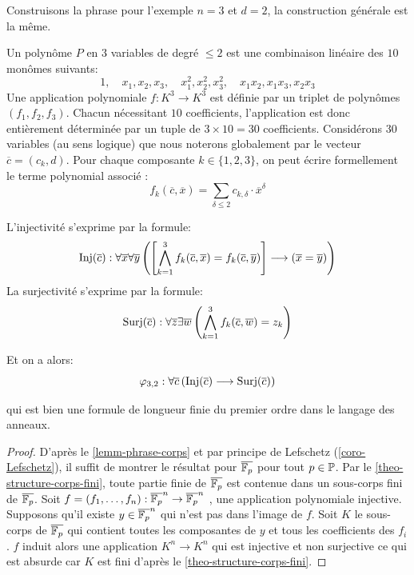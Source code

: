 \begin{exem}
Construisons la phrase pour l'exemple $n=3$ et $d=2$, la construction générale
est la même.

Un polynôme $P$ en $3$ variables de degré $\le 2$ est une combinaison linéaire des $10$ monômes suivants:
    \[ 1, \quad x_1, x_2, x_3, \quad x_1^2, x_2^2, x_3^2, \quad x_1x_2, x_1x_3, x_2x_3 \]
    Une application polynomiale $f: K^3 \to K^3$ est définie par un triplet de polynômes $(f_1, f_2, f_3)$.
    Chacun nécessitant $10$ coefficients, l'application est donc entièrement déterminée
    par un tuple de $3 \times 10 = 30$ coefficients.
    Considérons 30 variables (au sens logique) que nous noterons globalement par
    le vecteur $\overline{c} = (c_k,d)$. 
    Pour chaque composante $k \in \{1,2,3\}$, on peut écrire formellement le terme polynomial associé :
    \[ f_k(\overline{c}, \overline{x}) = \sum_{\delta \le 2} c_{k,\delta} \cdot \overline{x}^\delta \]

    L'injectivité s'exprime par la formule:
    \[ \operatorname{Inj}(\overline{c}): \forall \overline{x} \forall \overline{y} \left( \left[ \bigwedge_{k=1}^3 f_k(\overline{c}, \overline{x}) = f_k(\overline{c}, \overline{y}) \right] \longrightarrow (\overline{x} = \overline{y}) \right) \]
    La surjectivité s'exprime par la formule:
    \[  \operatorname{Surj}(\overline{c}) :\forall \overline{z} \exists \overline{w} \left( \bigwedge_{k=1}^3 f_k(\overline{c}, \overline{w}) = z_k \right) \]

    Et on a alors:
    \[ \varphi_{3,2} : \forall \overline{c} \left( \operatorname{Inj}(\overline{c}) \longrightarrow
    \operatorname{Surj}(\overline{c}) \right) \]
    
    qui est bien une formule de longueur finie du premier ordre dans le langage des anneaux.
\end{exem}

\begin{proof}
D'après le \cref{lemm-phrase-corps} et par principe de Lefschetz (\cref{coro-Lefschetz}), il suffit de
montrer le résultat
pour $\overline{\mathbb{F}_p}$ pour tout $p \in \mathbb{P}$. Par le \cref{theo-structure-corps-fini}, toute partie finie de $\overline{\mathbb{F}_p}$ est contenue dans
un sous-corps fini de $\overline{\mathbb{F}_p}$. Soit $f = (f_1, \ldots, f_n) : \overline{\mathbb{F}_p}^n
\rightarrow \overline{\mathbb{F}_p}^n$ ,  une application polynomiale injective. Supposons qu'il
existe $y \in \overline{\mathbb{F}_p}^n$ qui n'est pas dans l'image de $f$. Soit $K$ le sous-corps de $\overline{\mathbb{F}_p}$ qui contient toutes les composantes de $y$ et tous les
coefficients des $f_i$. $f$ induit alors une application $K^n \rightarrow K^n$
qui est injective et non surjective ce qui est absurde car $K$ est fini d'après le
\cref{theo-structure-corps-fini}.
\end{proof}


